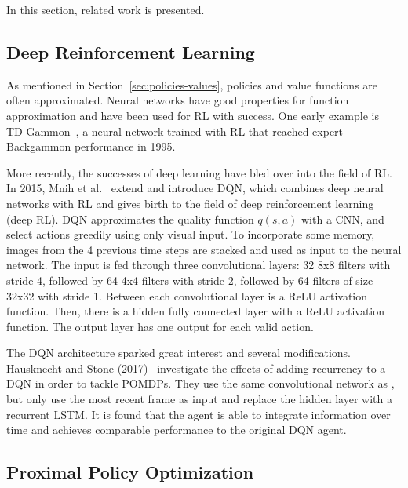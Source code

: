 In this section, related work is presented.

\subsection{Deep Reinforcement Learning}


As mentioned in Section~\ref{sec:policies-values}, policies and value functions are often approximated.
Neural networks have good properties for function approximation and have been used for RL with success.
One early example is TD-Gammon~\cite{tesauro1995tdgammon}, a neural network trained with RL that reached expert Backgammon performance in 1995.

More recently, the successes of deep learning have bled over into the field of RL.
In 2015, Mnih et al.~\cite{mnih_human_2015} extend \cite{mnih_atari_2013} and introduce DQN, which combines deep neural networks with RL and gives birth to the field of deep reinforcement learning (deep RL).
DQN approximates the quality function \(q(s, a)\) with a CNN, and select actions greedily using only visual input.
To incorporate some memory, images from the 4 previous time steps are stacked and used as input to the neural network.
The input is fed through three convolutional layers:
32 8x8 filters with stride 4,
followed by 64 4x4 filters with stride 2,
followed by 64 filters of size 32x32 with stride 1.
Between each convolutional layer is a ReLU activation function.
Then, there is a hidden fully connected layer with a ReLU activation function.
The output layer has one output for each valid action.

The DQN architecture sparked great interest and several modifications.
Hausknecht and Stone (2017)~\cite{hausknecht_stone_2017} investigate the effects of adding recurrency to a DQN in order to tackle POMDPs.
They use the same convolutional network as \cite{mnih_human_2015}, but only use the most recent frame as input and replace the hidden layer with a recurrent LSTM.
It is found that the agent is able to integrate information over time and achieves comparable performance to the original DQN agent.

\subsection{Proximal Policy Optimization}

